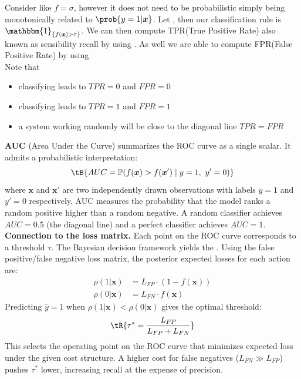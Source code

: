 Consider  like $f=\sigma$, 
however it does not need to be probabilistic simply being monotonically related to 
$\prob{y=1|\bm{x}}$. Let , then our 
classification rule is 
$\mathbbm{1}_{\{f(\bm{x})> \tau\}}$. We can then compute TPR(True Positive Rate) also
known as sensibility recall by using .
As well we are able to compute FPR(False Positive Rate) by using \\
Note that 
\begin{itemize}
    \item classifying  leads to $TPR=0$ and 
        $FPR=0$
    \item classifying  leads to $TPR=1$ and 
        $FPR=1$
    \item a system working randomly will be close to the diagonal line $TPR=FPR$
\end{itemize}
\textbf{AUC} (Area Under the Curve) summarizes the ROC curve as a single scalar. It admits
a probabilistic interpretation:
$$\tB{AUC = \mathbb{P}(f(\bm{x}) > f(\bm{x}') \mid y=1,\ y'=0)}$$
where $\bm{x}$ and $\bm{x}'$ are two independently drawn observations with labels $y=1$
and $y'=0$ respectively. AUC measures the probability that the model ranks a random
positive higher than a random negative. A random classifier achieves $AUC=0.5$ (the diagonal line)
and a perfect classifier achieves $AUC=1$.\\
\textbf{Connection to the loss matrix.} Each point on the ROC curve corresponds to a
threshold $\tau$. The Bayesian decision framework yields the . Using the false positive/false negative loss matrix, the
posterior expected losses for each action are:
\begin{align*}
    \rho(1|\bm{x}) &= L_{FP}\cdot(1 - f(\bm{x}))\\
    \rho(0|\bm{x}) &= L_{FN}\cdot f(\bm{x})
\end{align*}
Predicting $\hat{y}=1$ when $\rho(1|\bm{x}) < \rho(0|\bm{x})$ gives the optimal threshold:
$$\tR{\tau^* = \frac{L_{FP}}{L_{FP} + L_{FN}}}$$
This selects the operating point on the ROC curve that minimizes expected loss under the
given cost structure. A higher cost for false negatives ($L_{FN} \gg L_{FP}$) pushes
$\tau^*$ lower, increasing recall at the expense of precision.


